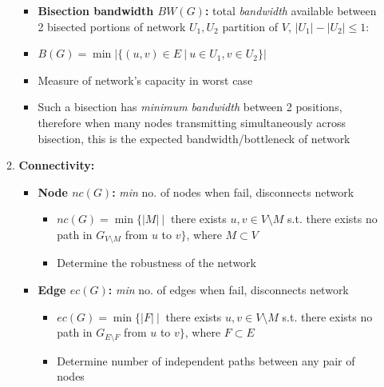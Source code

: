 \documentclass[10pt,landscape]{article}
\begin{document}
\begin{multicols*}{3}
\begin{itemize}[topsep=0pt,noitemsep,wide=0pt, leftmargin=\dimexpr{} + 2\relax]
\begin{enumerate}[topsep=0pt,noitemsep,wide=0pt, leftmargin=\dimexpr\labelwidth + 2\labelsep\relax]
        \begin{itemize}[topsep=0pt,noitemsep,wide=0pt, leftmargin=\dimexpr{} + 2\relax]
            \item \textbf{Bisection bandwidth $BW(G)$:} total \textit{bandwidth} available between 2 bisected portions of network $U_1, U_2$ partition of $V$, $|U_1| - |U_2| \leq 1$:
            \item $B(G) = \min |\{(u, v) \in E \ | \ u \in U_1, v \in U_2 \} |$
            \item Measure of network's capacity in worst case
            \item Such a bisection has \textit{minimum bandwidth} between 2 positions, therefore when many nodes transmitting simultaneously across bisection, this is the expected bandwidth/bottleneck of network
        \end{itemize}
        \item \textbf{Connectivity:}
        \begin{itemize}[topsep=0pt,noitemsep,wide=0pt, leftmargin=\dimexpr{} + 2\relax]
            \item \textbf{Node $nc(G)$:} \textit{min} no. of nodes when fail, disconnects network
            \begin{itemize}[topsep=0pt,noitemsep,wide=0pt, leftmargin=\dimexpr{} + 2\relax]
                \item $nc(G) = \min \{|M| \ | \ $ there exists $u, v \in V \setminus M$ s.t. there exists no path in $G_{V \setminus M}$ from $u$ to $v \}$, where $M \subset V$
                \item Determine the robustness of the network
            \end{itemize}
            \item \textbf{Edge $ec(G)$:} \textit{min} no. of edges when fail, disconnects network
            \begin{itemize}[topsep=0pt,noitemsep,wide=0pt, leftmargin=\dimexpr{} + 2\relax]
                \item $ec(G) = \min \{|F| \ | \ $ there exists $u, v \in V \setminus M$ s.t. there exists no path in $G_{E \setminus F}$ from $u$ to $v \}$, where $F \subset E$
                \item Determine number of independent paths between any pair of nodes
            \end{itemize}
        \end{itemize}
    \end{enumerate}
\end{itemize}


\end{multicols*}
\end{document}
